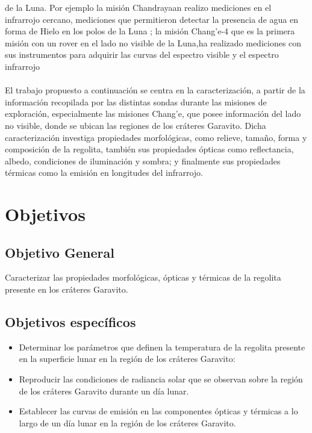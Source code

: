 \documentclass[12pt]{article}
\begin{document}
de la Luna. Por ejemplo la misión Chandrayaan realizo mediciones en el infrarrojo cercano, mediciones que 
permitieron detectar la presencia de agua en forma de Hielo en los polos de la Luna 
\parencite{VERMA2022115075}; 
la misión Chang'e-4 que es la primera misión con un rover en el lado no visible de la Luna,ha realizado 
mediciones con sus instrumentos para adquirir las curvas del espectro visible y el espectro infrarrojo 
\parencite{JIA2018207} \\
\\
El trabajo propuesto a continuación se centra en la caracterización, a partir de la información 
recopilada por las distintas sondas durante las misiones de exploración, especialmente las misiones Chang'e, 
que posee información del lado no visible, donde se ubican las regiones de 
los cráteres Garavito. Dicha caracterización investiga propiedades morfológicas, como relieve, tamaño, forma 
y composición de la regolita, también sus propiedades ópticas como reflectancia, albedo, 
condiciones de iluminación y sombra; y finalmente sus propiedades térmicas como la emisión 
en longitudes del infrarrojo\parencite{DSOUZA20242297}.

\newpage
\section{Objetivos}\label{sec:objetivos}
\subsection{Objetivo General}
Caracterizar las propiedades morfológicas, ópticas y térmicas de la regolita 
presente en los cráteres Garavito.
\subsection{Objetivos específicos}
\begin{itemize}
    \item Determinar los parámetros que definen la temperatura de la regolita 
    presente en la superficie lunar en la región de los cráteres Garavito:\\    
    \item Reproducir las condiciones de radiancia solar que se observan sobre la 
    región de los cráteres Garavito durante un día lunar.\\    
    \item Establecer las curvas de emisión en las componentes ópticas y térmicas a 
    lo largo de un día lunar en la región de los cráteres Garavito.\\    
\end{itemize}
\end{document}
